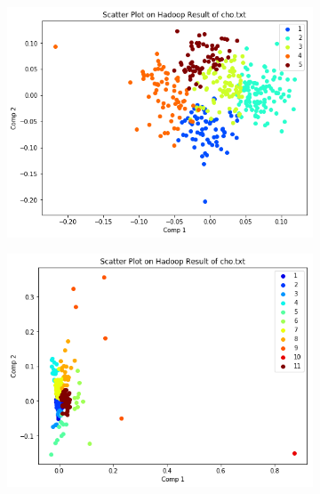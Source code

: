 \documentclass[fleqn]{llncs}
\begin{document}
\begin{figure}
	\centering
	\begin{subfigure}{0.45\textwidth}
		\centering
		\includegraphics[width=\textwidth]{hadoop_scatter_cho.png}
		\caption{}
		\label{Fig12_1}
	\end{subfigure}
	\begin{subfigure}{0.45\textwidth}
		\centering
		\includegraphics[width=\textwidth]{hadoop_scatter_iyer.png}
		\caption{}
		\label{Fig12_2}
	\end{subfigure}
	\caption{}
	\label{fig12}
\end{figure}
\end{document}
